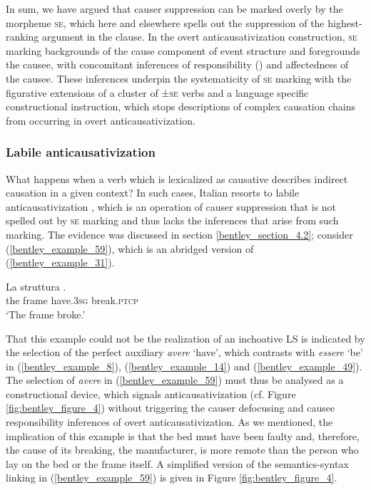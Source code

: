 \documentclass[output=paper,colorlinks,citecolor=brown
]{langscibook}
\begin{document}
In sum, we have argued that causer suppression can be marked overly by the morpheme \textsc{se}, which here and elsewhere spells out the suppression of the highest-ranking argument in the clause. In the overt anticausativization construction, \textsc{se} marking backgrounds of the cause component of event structure and foregrounds the causee, with concomitant inferences of responsibility (\cites[24 and references therein]{zribi1987reflexivite}{kailuweit2012construcciones}{martin2014anticausatives}) and affectedness \citep{lyons1969introduction} of the causee. These inferences underpin the systematicity of \textsc{se} marking with the figurative extensions of a cluster of ±\textsc{se} verbs and a language specific constructional instruction, which stops descriptions of complex causation chains from occurring in overt anticausativization. 

\subsubsection{Labile anticausativization}
\label{bentley_section_5.4.2}
What happens when a verb which is lexicalized as causative describes indirect causation in a given
context? In such cases, Italian resorts to labile anticausativization \citep{bentley2021two}, which
is an operation of causer suppression that is not spelled out by \textsc{se} marking and thus lacks
the inferences that arise from such marking. The evidence was discussed in section \ref{bentley_section_4.2}; consider (\ref{bentley_example_59}), which is an abridged version of (\ref{bentley_example_31}). 

\ea \label{bentley_example_59}
\gll La		struttura							. \\
			the		frame				have.3\textsc{sg}	break.\textsc{ptcp}	\\
\glt 			‘The frame broke.’
\z

That this example could not be the realization of an inchoative LS is indicated by the selection of the perfect auxiliary \textit{avere} ‘have’, which contrasts with \textit{essere} ‘be’ in (\ref{bentley_example_8}), (\ref{bentley_example_14}) and (\ref{bentley_example_49}). The selection of \textit{avere} in (\ref{bentley_example_59}) must thus be analysed as a constructional device, which signals anticausativization (cf. Figure \ref{fig:bentley_figure_4}) without triggering the causer defocusing and causee responsibility inferences of overt anticausativization. As we mentioned, the implication of this example is that the bed must have been faulty and, therefore, the cause of its breaking, the manufacturer, is more remote than the person who lay on the bed or the frame itself. A simplified version of the semantics-syntax linking in (\ref{bentley_example_59}) is given in Figure \ref{fig:bentley_figure_4}.
\end{document}

